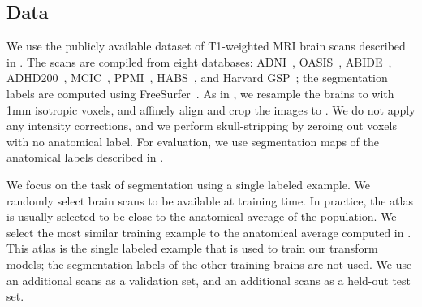 \documentclass[10pt,twocolumn,letterpaper]{article}
\begin{document}
\subsection{Data}
We use the publicly available dataset of T1-weighted MRI brain scans described in \cite{balakrishnan2018unsupervised}. The scans are compiled from eight databases: ADNI~\cite{mueller2005ways}, OASIS~\cite{marcus2007open}, ABIDE~\cite{di2014autism}, ADHD200~\cite{milham2012adhd}, MCIC~\cite{gollub2013mcic}, PPMI~\cite{marek2011parkinson}, HABS~\cite{dagley2017harvard}, and Harvard GSP~\cite{holmes2015brain}; the segmentation labels are computed using FreeSurfer~\cite{fischl2012}. As in \cite{balakrishnan2018unsupervised}, we resample the brains to  with 1mm isotropic voxels, and affinely align and crop the images to . We do not apply any intensity corrections, and we perform skull-stripping by zeroing out voxels with no anatomical label. For evaluation, we use segmentation maps of the  anatomical labels described in \cite{balakrishnan2018unsupervised}. 


We focus on the task of segmentation using a single labeled example. We randomly select  brain scans to be available at training time. In practice, the atlas is usually selected to be close to the anatomical average of the population. We select the most similar training example to the anatomical average computed in \cite{balakrishnan2018unsupervised}. This atlas is the single labeled example that is used to train our transform models; the segmentation labels of the other  training brains are not used. We use an additional  scans as a validation set, and an additional  scans as a held-out test set. 
\end{document}
